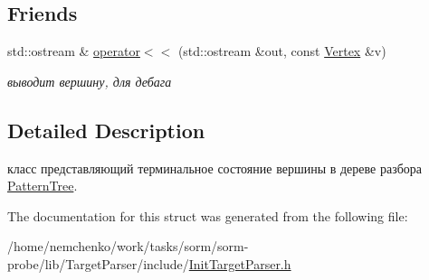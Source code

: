 \subsection*{Friends}
\begin{DoxyCompactItemize}
\item 
std\+::ostream \& \hyperlink{structtarget__parser_1_1Vertex_a4e49de56cff8bdd50a1901814dd4f5c0}{operator$<$$<$} (std\+::ostream \&out, const \hyperlink{structtarget__parser_1_1Vertex}{Vertex} \&v)\hypertarget{structtarget__parser_1_1Vertex_a4e49de56cff8bdd50a1901814dd4f5c0}{}\label{structtarget__parser_1_1Vertex_a4e49de56cff8bdd50a1901814dd4f5c0}

\begin{DoxyCompactList}\small\item\em выводит вершину, для дебага \end{DoxyCompactList}\end{DoxyCompactItemize}


\subsection{Detailed Description}
класс представляющий терминальное состояние вершины в дереве разбора \hyperlink{classtarget__parser_1_1PatternTree}{Pattern\+Tree}. 

The documentation for this struct was generated from the following file\+:\begin{DoxyCompactItemize}
\item 
/home/nemchenko/work/tasks/sorm/sorm-\/probe/lib/\+Target\+Parser/include/\hyperlink{InitTargetParser_8h}{Init\+Target\+Parser.\+h}\end{DoxyCompactItemize}
